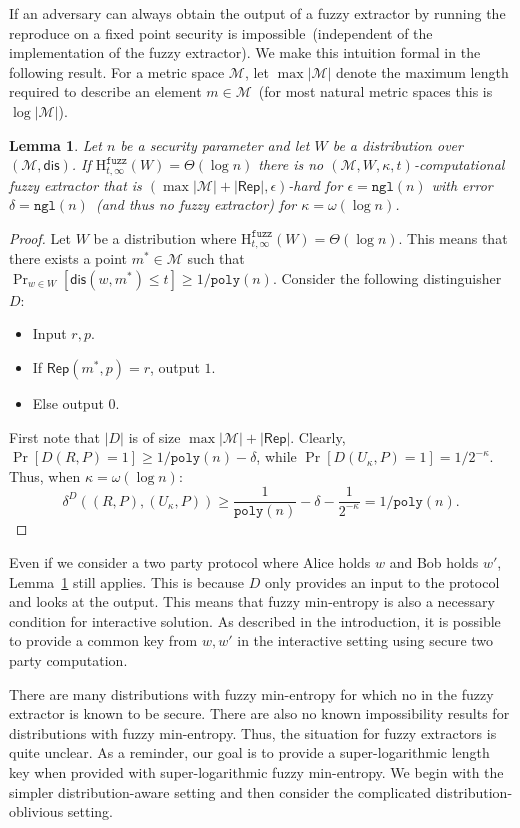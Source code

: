 \documentclass[11pt]{article}
\newcommand{\lemref}[1]{\mbox{Lemma~\ref{#1}}}
\newcommand{\class}[1]{{\ensuremath{\mathsf{#1}}}}
\newcommand{\rep}{\ensuremath{\class{Rep}}\xspace}
\newcommand{\dis}{\ensuremath{\mathsf{dis}}}
\newcommand{\poly}{\ensuremath{\mathtt{poly}}\xspace}
\newcommand{\ngl}{\ensuremath{\mathtt{ngl}}\xspace}
\newcommand{\Hfuzz}{\mathrm{H}^{\mathtt{fuzz}}_{t,\infty}}
\newtheorem{lemma}[theorem]{Lemma}
\begin{document}
If an adversary can always obtain the output of a fuzzy extractor by running the reproduce on a fixed point security is impossible~(independent of the implementation of the fuzzy extractor).  We make this intuition formal in the following result.  
For a metric space $\mathcal{M}$, let $\max |\mathcal{M}|$ denote the maximum length required to describe an element $m\in\mathcal{M}$~(for most natural metric spaces this is $\log |\mathcal{M}|$).
\begin{lemma}
\label{lem:fuzz necessary}
Let $n$ be a security parameter and let $W$ be a distribution over $(\mathcal{M}, \dis)$.
If $\Hfuzz (W) = \Theta(\log n)$ there is no $(\mathcal{M}, W, \kappa, t)$-computational fuzzy extractor that is $(\max |\mathcal{M}| +  |\rep|, \epsilon)$-hard for $\epsilon = \ngl(n)$ with error $\delta = \ngl(n)$~(and thus no fuzzy extractor) for $\kappa =\omega(\log n)$.
\end{lemma}
\begin{proof}
Let $W$ be a distribution where $\Hfuzz(W) = \Theta(\log n)$.  This means that there exists a point $m^*\in \mathcal{M}$ such that $\Pr_{w\in W}[\dis (w, m^*)\leq t] \geq 1/\poly(n)$.  Consider the following distinguisher $D$:
\begin{itemize}
\item Input $r, p$.
\item If $\rep(m^*, p) = r$, output $1$.
\item Else output $0$.
\end{itemize}
First note that $|D|$ is of size $\max |\mathcal{M}|+ |\rep|$.  Clearly, $\Pr[D(R, P) = 1]\geq 1/\poly(n) - \delta$, while $\Pr[D(U_\kappa, P)=1 ]= 1/2^{-\kappa}$.  Thus, when $\kappa = \omega(\log n)$:
\[
\delta^D((R, P), (U_\kappa, P))\geq \frac{1}{\poly(n)} -\delta -  \frac{1}{2^{-\kappa}} = 1/\poly(n).
\]
\end{proof}
Even if we consider a two party protocol where Alice holds $w$ and Bob holds $w'$, 
\lemref{lem:fuzz necessary} still applies.  This is because $D$ only provides an input to the protocol and looks at the output.  This means that fuzzy min-entropy is also a necessary condition for interactive solution.  As described in the introduction, it is possible to provide a common key from $w, w'$ in the interactive setting using secure two party computation.

There are many distributions with fuzzy min-entropy for which no in the fuzzy extractor is known to be secure.  There are also no known impossibility results for distributions with fuzzy min-entropy.  Thus, the situation for fuzzy extractors is quite unclear.
As a reminder, our goal is to provide a super-logarithmic length key when provided with super-logarithmic fuzzy min-entropy.  We begin with the simpler distribution-aware setting and then consider the complicated distribution-oblivious setting.
\end{document}
